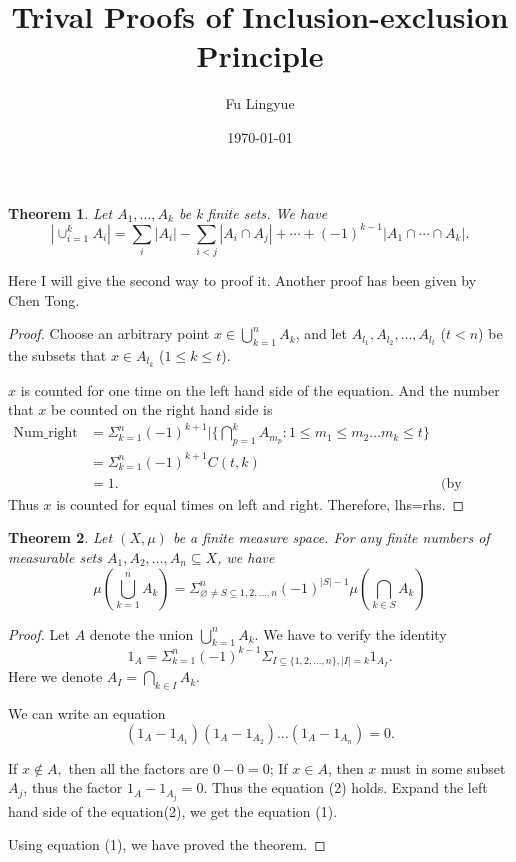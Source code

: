 
\newtheorem{theorem}{Theorem}
\title{Trival Proofs of Inclusion-exclusion Principle}
\author{Fu Lingyue}
\date{\today}

\maketitle
\begin{theorem}
  Let $A_1, \dots, A_k$ be k finite sets. We have 
  $$|\cup_{i=1}^k A_i |=\sum_i|A_i|-\sum_{i<j}|A_i \cap A_j|+\cdots+(-1)^{k-1}|A_1 \cap \cdots \cap A_k|.$$
\end{theorem}

Here I will give the second way to proof it. Another proof has been given by Chen Tong.
\begin{proof}
  Choose an arbitrary point $x\in\bigcup_{k=1}^n A_k$, and let $A_{l_1},A_{l_2},\dots,A_{l_t}$ ($t<n$) be the subsets that $x\in A_{l_k}$ ($1\leq k\leq t$).
  
  $x$ is counted for one time on the left hand side of the equation. And the number that $x$  be counted  on the right hand side is 
  \begin{equation}
  \nonumber
    \begin{aligned}
    \text{Num\_right} &=
      \Sigma_{k=1}^n(-1)^{k+1} |\{\bigcap_{p=1}^k A_{m_p}:1\leq m_1\leq m_2\dots m_k\leq t\} \\
      &= \Sigma_{k=1}^n(-1)^{k+1}C(t,k)\\
      & = 1. & \text{(by Binomial Theorem)}
    \end{aligned}
  \end{equation}
  Thus $x$ is counted for equal times on left and right. Therefore, lhs=rhs.
  
\end{proof}


\begin{theorem}
  Let $(X,\mu)$ be a finite measure space. For any finite numbers of measurable sets $A_1,A_2,\dots,A_n\subseteq X$, we have
  $$\mu(\bigcup_{k=1}^n A_k) = \Sigma_{\varnothing \not= S\subseteq1,2,\dots,n}^n  (-1)^{|S|-1}\mu(\bigcap_{k\in S}A_k)$$
\end{theorem}
\begin{proof}
  Let $A$ denote the union $\bigcup_{k=1}^n A_k$. We have to verify the identity
  \begin{equation}
    1_A = \Sigma_{k=1}^n(-1)^{k-1} \Sigma_{I\subseteq \{1,2,\dots,n\}, |I| = k} 1_{A_I}.
  \end{equation}
  Here we denote $A_I = \bigcap_{k\in I} A_k$.
  
  We can write an equation
  \begin{equation}
    (1_A - 1_{A_1})(1_A - 1_{A_2})\dots (1_A - 1_{A_n}) = 0.
  \end{equation}

If $x\notin A,$ then all the factors are $0-0 = 0$;  If  $x\in A$, then $x$ must in some subset $A_j$, thus the  factor $1_A -  1_{A_j} = 0$. Thus the equation (2) holds. Expand the left hand side of the equation(2), we get the equation (1).

Using equation (1), we have proved the theorem.
  
  
\end{proof}
